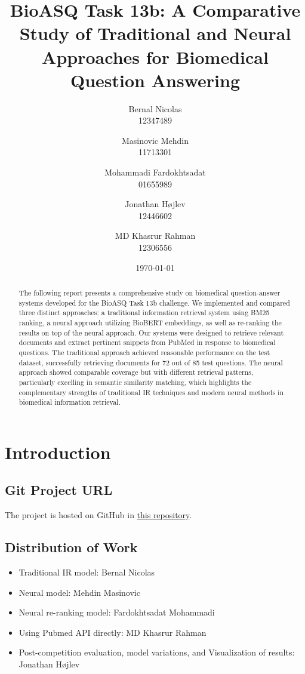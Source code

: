 \documentclass[12pt]{article}
\title{BioASQ Task 13b: A Comparative Study of Traditional and Neural Approaches for Biomedical Question Answering}
\author{
Bernal Nicolas\\12347489
\and
Masinovic Mehdin\\11713301
\and
Mohammadi Fardokhtsadat\\01655989
\and
Jonathan Højlev\\12446602
\and
MD Khasrur Rahman\\ 12306556
}
\date{\today}
\begin{document}
\maketitle

\begin{abstract}
The following report presents a comprehensive study on biomedical question-answer systems developed for the BioASQ Task 13b challenge. We implemented and compared three distinct approaches: a traditional information retrieval system using BM25 ranking, a neural approach utilizing BioBERT embeddings, as well as re-ranking the results on top of the neural approach. Our systems were designed to retrieve relevant documents and extract pertinent snippets from PubMed in response to biomedical questions. The traditional approach achieved reasonable performance on the test dataset, successfully retrieving documents for 72 out of 85 test questions. The neural approach showed comparable coverage but with different retrieval patterns, particularly excelling in semantic similarity matching, which highlights the complementary strengths of traditional IR techniques and modern neural methods in biomedical information retrieval.
\end{abstract}

\section{Introduction}

\subsection{Git Project URL}

The project is hosted on GitHub in \href{https://github.com/MehdinMasinovic/bioasq-13b/tree/main}{this repository}.

\subsection{Distribution of Work}

\begin{itemize}
  \item Traditional IR model: Bernal Nicolas
  \item Neural model: Mehdin Masinovic
  \item Neural re-ranking model: Fardokhtsadat Mohammadi
  \item Using Pubmed API directly: MD Khasrur Rahman
  \item Post-competition evaluation, model variations, and Visualization of results: Jonathan Højlev
\end{itemize}
\end{document}
